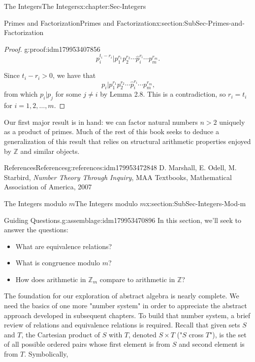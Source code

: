 \documentclass[oneside,10pt,]{book}
\numberwithin{equation}{section}
\def\Z{{\mathbb Z}}
\begin{document}
\begin{chapterptx}{The Integers}{}{The Integers}{}{}{x:chapter:Sec-Integers}
\begin{sectionptx}{Primes and Factorization}{}{Primes and Factorization}{}{}{x:section:SubSec-Primes-and-Factorization}
\begin{proof}{}{g:proof:idm179953407856}
\begin{equation*}
p_i^{t_i - r_i} | p_1^{r_1} p_2^{r_2} \cdots \hat{p}_i^{r_i} \cdots p_m^{r_m}\text{.}
\end{equation*}
%
\par
Since \(t_i - r_i > 0\), we have that%
\begin{equation*}
p_i  | p_1^{r_1} p_2^{r_2} \cdots \hat{p}_i^{r_i} \cdots p_m^{r_m}\text{,}
\end{equation*}
from which \(p_i | p_j\) for some \(j\ne i\) by Lemma 2.8. This is a contradiction, so \(r_i = t_i\) for \(i = 1, 2, \ldots, m\).%
\end{proof}
Our first major result is in hand: we can factor natural numbers \(n > 2\) uniquely as a product of primes. Much of the rest of this book seeks to deduce a generalization of this result that relies on structural arithmetic properties enjoyed by \(\Z\) and similar objects.%
%
%
\typeout{************************************************}
\typeout{************************************************}
%
\begin{references-subsection-numberless}{References}{}{References}{}{}{g:references:idm179953472848}
D. Marshall, E. Odell, M. Starbird, \emph{Number Theory Through Inquiry}, MAA Textbooks, Mathematical Association of America, 2007\end{references-subsection-numberless}
\end{sectionptx}
%
%
\typeout{************************************************}
\typeout{************************************************}
%
\begin{sectionptx}{The Integers modulo \(m\)}{}{The Integers modulo \(m\)}{}{}{x:section:SubSec-Integers-Mod-m}
\begin{assemblage}{Guiding Questions.}{g:assemblage:idm179953470896}%
In this section, we'll seek to answer the questions: %
\begin{itemize}[label=\textbullet]
\item{}What are equivalence relations?%
\item{}What is congruence modulo \(m\)?%
\item{}How does arithmetic in \(\Z_m\) compare to arithmetic in \(\Z\)?%
\end{itemize}
%
\end{assemblage}
The foundation for our exploration of abstract algebra is nearly complete. We need the basics of one more "number system" in order to appreciate the abstract approach developed in subsequent chapters. To build that number system, a brief review of relations and equivalence relations is required. Recall that given sets \(S\) and \(T\), the Cartesian product of \(S\) with \(T\), denoted \(S\times T\) ("\(S\) cross \(T\)"), is the set of all possible ordered pairs whose first element is from \(S\) and second element is from \(T\). Symbolically,%

\end{sectionptx}
\end{chapterptx}
\end{document}
